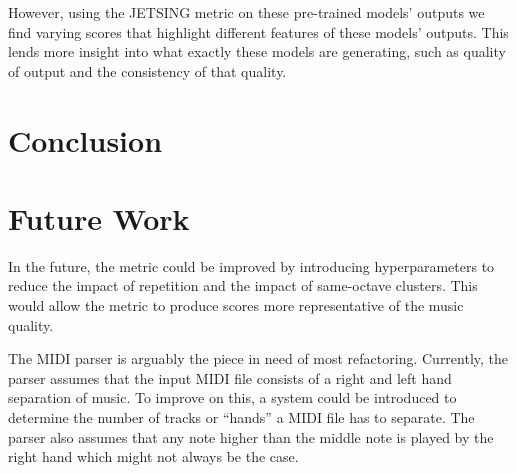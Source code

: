 \documentclass[11pt]{article}
\begin{document}
However, using the JETSING metric on these pre-trained models' outputs we find varying scores that highlight different features of these models' outputs.
This lends more insight into what exactly these models are generating, such as quality of output and the consistency of that quality.

\section{Conclusion}

\section{Future Work}

In the future, the metric could be improved by introducing hyperparameters to reduce the impact of repetition and the impact of same-octave clusters.
This would allow the metric to produce scores more representative of the music quality.

The MIDI parser is arguably the piece in need of most refactoring.
Currently, the parser assumes that the input MIDI file consists of a right and left hand separation of music.
To improve on this, a system could be introduced to determine the number of tracks or “hands” a MIDI file has to separate.
The parser also assumes that any note higher than the middle note is played by the right hand which might not always be the case.




\nocite{huang2018music, kotecha2018generating, vaswani2017attention, zhao2020verticalhorizontal, performance-rnn-2017, musicVAE}
\end{document}
